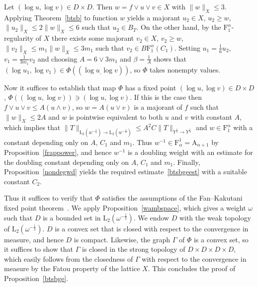 \documentclass[12pt]{amsart}
\newcommand {\apclass} [1] {\ensuremath{\mathrm A_{#1}}}
\newcommand {\frclass} [2] {\ensuremath{\mathrm F^{#1}_{#2}}}
\newcommand {\lclass} [2] {\ensuremath{\mathrm L_{#1} \left( #2 \right) }}
\newcommand {\weightu} {\ensuremath {\mathit u}}
\newcommand {\weightv} {\ensuremath {\mathit v}}
\newcommand {\weightw} {\ensuremath {\mathit w}}
\newcommand {\fbab} [3] {\ensuremath {B\frclass {#1} {#2} \left(#3\right)}}
\begin{document}
Let $(\log \weightu, \log \weightv) \in D \times D$.  Then $\weightw = f \vee \weightu \vee \weightv \in X$
with $\|\weightw\|_X \leqslant 3$.
Applying Theorem~\ref {btsb} to function $\weightw$ yields a majorant $\weightu_2 \in X$,
$\weightu_2 \geqslant \weightw$, $\|\weightu_2\|_X \leqslant 2 \|\weightw\|_X \leqslant 6$
such that $\weightu_2 \in B_T$.  On the other hand, by the $\frclass {\alpha} {1}$-regularity of $X$
there exists some majorant $\weightv_2 \in X$, $\weightv_2 \geqslant \weightw$,
$\|\weightv_2\|_X \leqslant m_1 \|\weightw\|_X \leqslant 3 m_1$ such that $\weightv_2 \in \fbab {\alpha} {1} {C_1}$.
Setting  $\weightu_1 = \frac 1 6 \weightu_2$, $\weightv_1 = \frac 1 {3 m_1} \weightv_2$ and choosing
$A = 6 \vee 3 m_1$ and $\beta = \frac 1 A$ shows that
$(\log \weightu_1, \log \weightv_1) \in \Phi ((\log \weightu_, \log \weightv))$, so $\Phi$ takes nonempty values.

Now it suffices to establish that map $\Phi$ has a fixed point $(\log \weightu, \log \weightv) \in D \times D$,
$\Phi ((\log \weightu, \log \weightv)) \ni (\log \weightu, \log \weightv)$.  If this is the case
then $f \vee \weightu \vee \weightv \leqslant A (\weightu \wedge \weightv)$,
so $\weightw = A (\weightu \vee \weightv)$ is a majorant of $f$ such that
$\|\weightw\|_X \leqslant 2 A$ and
$\weightw$ is pointwise equivalent to both $\weightu$ and $\weightv$ with constant $A$,
which implies that
$\|T\|_{\lclass {2} {\weightw^{-\frac 1 2}} \to \lclass {2} {\weightw^{-\frac 1 2}}} \leqslant A^2 C \|T\|_{Y^{\frac 1 2} \to Y^{\frac 1 2}}$ and
$\weightw \in \frclass {\alpha} {1}$ with a constant depending only on $A$, $C_1$ and $m_1$.
Thus $\weightw^{-1} \in \frclass {1} {\alpha} = \apclass {\alpha + 1}$ by Proposition~\ref {frappower},
and hence $\weightw^{-1}$ is a doubling weight with an estimate for the doubling constant
depending only on $A$, $C_1$ and $m_1$.
Finally, Proposition~\ref {nondegwd} yields the required estimate~\ref {btsbgeest} with a suitable constant $C_2$.

Thus it suffices to verify that $\Phi$ satisfies the assumptions of the Fan--Kakutani fixed point
theorem~\cite {fanky1952}.  We apply Proposition~\ref {wambspace},
which gives a weight $\omega$ such that $D$ is a bounded set in $\lclass {2} {\omega^{-\frac 1 2}}$.
We endow $D$ with the weak topology of $\lclass {2} {\omega^{-\frac 1 2}}$.
$D$ is a convex set that is closed with respect to the convergence in measure,
and hence $D$ is compact.
Likewise, the graph $\Gamma$ of $\Phi$ is a convex set, so it suffices
to show that $\Gamma$ is closed in the strong topology of $D \times D \times D \times D$, which easily follows
from the closedness of $\Gamma$ with respect to the convergence in measure
by the Fatou property of the lattice $X$.
This concludes the proof of Proposition~\ref {btsbge}.
\end{document}
